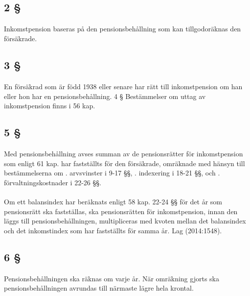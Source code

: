 \documentclass[a4paper,notitlepage,openany,10pt]{book}
\begin{document}
\subsection*{2 §}
\paragraph*{}
Inkomstpension baseras på den pensionsbehållning som kan tillgodoräknas den försäkrade.
\subsection*{3 §}
\paragraph*{}
En försäkrad som är född 1938 eller senare har rätt till inkomstpension om han eller hon har en pensionsbehållning. 4 § Bestämmelser om uttag av inkomstpension finns i 56 kap.
\subsection*{5 §}
\paragraph*{}
Med pensionsbehållning avses summan av de pensionsrätter för inkomstpension som enligt 61 kap. har fastställts för den försäkrade, omräknade med hänsyn till bestämmelserna om
. arvsvinster i 9-17 §§,
. indexering i 18-21 §§, och
. förvaltningskostnader i 22-26 §§.
\paragraph*{}
Om ett balansindex har beräknats enligt 58 kap. 22-24 §§ för det år som pensionsrätt ska fastställas, ska pensionsrätten för inkomstpension, innan den läggs till pensionsbehållningen, multipliceras med kvoten mellan det balansindex och det inkomstindex som har fastställts för samma år.
Lag (2014:1548).
\subsection*{6 §}
\paragraph*{}
Pensionsbehållningen ska räknas om varje år. När omräkning gjorts ska pensionsbehållningen avrundas till närmaste lägre hela krontal.
\end{document}
